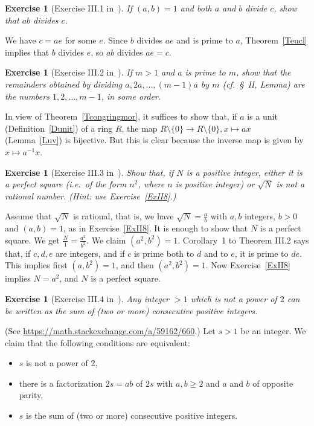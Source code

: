\documentclass[12pt,letterpaper]{article}
\newtheorem{exer}[thm]{Exercise}
\theoremstyle{definition}
\begin{document}
\begin{exer}[Exercise III.1 in~\cite{weil1979}]\label{ExIII1} 
If $(a,b)=1$ and both $a$ and $b$ divide $c$, show that $ab$ divides $c$.
\end{exer} 

We have $c=ae$ for some $e$. Since $b$ divides $ae$ and is prime to $a$, Theorem~\ref{Teucl} implies that $b$ divides $e$, so $ab$ divides $ae=c$. 

\begin{exer}[Exercise III.2 in~\cite{weil1979}]\label{ExIII2}
If $m>1$ and $a$ is prime to $m$, show that the remainders obtained by dividing $a,2a,\ldots,(m-1)a$ by $m$ (cf.\ \S~II, Lemma) are the numbers $1,2,\ldots,m-1$, in some order.
\end{exer} 

In view of Theorem~\ref{Tcongringmor}, it suffices to show that, if $a$ is a unit (Definition~\ref{Dunit}) of a ring $R$, the map $R\setminus\{0\}\to R\setminus\{0\}, x\mapsto ax$ (Lemma~\ref{Luv}) is bijective. But this is clear because the inverse map is given by $x\mapsto a^{-1}x$. 

\begin{exer}[Exercise III.3 in~\cite{weil1979}]\label{ExIII3}
Show that, if $N$ is a positive integer, either it is a perfect square (i.e.\ of the form $n^2$, where $n$ is positive integer) or $\sqrt{N}$ is not a rational number. (Hint: use Exercise~\ref{ExII8}.) 
\end{exer} 

Assume that $\sqrt{N}$ is rational, that is, we have $\sqrt{N}=\frac{a}{b}$ with $a,b$ integers, $b>0$ and $(a,b)=1$, as in Exercise~\ref{ExII8}. It is enough to show that $N$ is a perfect square. We get $\frac{N}{1}=\frac{a^2}{b^2}$. We claim $(a^2,b^2)=1$. Corollary~1 to Theorem III.2 says that, if $c,d,e$ are integers, and if $c$ is prime both to $d$ and to $e$, it is prime to $de$. This implies first $(a,b^2)=1$, and then $(a^2,b^2)=1$. Now Exercise~\ref{ExII8} implies $N=a^2$, and $N$ is a perfect square. 

\begin{exer}[Exercise III.4 in~\cite{weil1979}]
Any integer $>1$ which is not a power of $2$ can be written as the sum of (two or more) consecutive positive integers. 
\end{exer} 

{\footnotesize (See \url{https://math.stackexchange.com/a/59162/660}.)} Let $s>1$ be an integer. We claim that the following conditions are equivalent: 
\begin{itemize}
  \item[(a)] $s$ is not a power of 2, 
  \item[(b)] there is a factorization $2s=ab$ of $2s$ with $a,b\ge2$ and $a$ and $b$ of opposite parity, 
  \item[(c)] $s$ is the sum of (two or more) consecutive positive integers.
\end{itemize}
\end{document}
